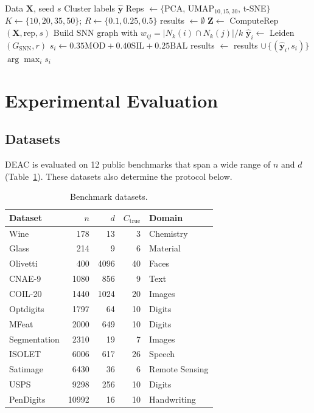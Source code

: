 \documentclass[journal]{IEEEtran}
\begin{document}
\begin{algorithm}[!t]
\caption{EMR-CGC --- Engine 2}
\label{alg:emrcgc}
\begin{algorithmic}[1]
\REQUIRE Data $\mathbf{X}$, seed $s$
\ENSURE Cluster labels $\hat{\mathbf{y}}$
\STATE Reps $\leftarrow \{$PCA, UMAP$_{10,15,30}$, t-SNE$\}$
\STATE $K \leftarrow \{10, 20, 35, 50\}$; $R \leftarrow \{0.1, 0.25, 0.5\}$
\STATE results $\leftarrow \emptyset$
  \STATE $\mathbf{Z} \leftarrow$ ComputeRep$(\mathbf{X}, \text{rep}, s)$
    \STATE Build SNN graph with $w_{ij}=|N_k(i)\cap N_k(j)|/k$
    \STATE $\hat{\mathbf{y}}_i \leftarrow$ Leiden$(G_{\text{SNN}}, r)$
    \STATE $s_i \leftarrow 0.35\text{MOD}+0.40\text{SIL}+0.25\text{BAL}$
    \STATE results $\leftarrow$ results $\cup\,\{(\hat{\mathbf{y}}_i, s_i)\}$
  \ENDFOR
\ENDFOR
\RETURN $\arg\max_i s_i$
\end{algorithmic}
\end{algorithm}

\section{Experimental Evaluation}\label{sec:exp}

\subsection{Datasets}

DEAC is evaluated on 12 public benchmarks that span a wide range of $n$ and $d$ (Table~\ref{tab:datasets}). These datasets also determine the protocol below.

\begin{table}[htbp]
\centering
\caption{Benchmark datasets.}
\label{tab:datasets}
\footnotesize
\setlength{\tabcolsep}{4pt}
\begin{tabular}{lrrrl}
\toprule
Dataset & $n$ & $d$ & $C_{\text{true}}$ & Domain \\
\midrule
Wine         & 178   & 13   & 3  & Chemistry \\
Glass        & 214   & 9    & 6  & Material \\
Olivetti     & 400   & 4096 & 40 & Faces \\
CNAE-9       & 1080  & 856  & 9  & Text \\
COIL-20      & 1440  & 1024 & 20 & Images \\
Optdigits    & 1797  & 64   & 10 & Digits \\
MFeat        & 2000  & 649  & 10 & Digits \\
Segmentation & 2310  & 19   & 7  & Images \\
ISOLET       & 6006  & 617  & 26 & Speech \\
Satimage     & 6430  & 36   & 6  & Remote Sensing \\
USPS         & 9298  & 256  & 10 & Digits \\
PenDigits    & 10992 & 16   & 10 & Handwriting \\
\bottomrule
\end{tabular}
\end{table}
\end{document}
